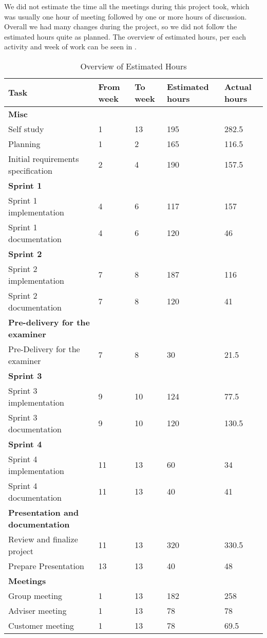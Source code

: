 \documentclass[../document]{subfiles}
\begin{document}
We did not estimate the time all the meetings during this project took, which was usually one hour of meeting followed by one or more hours of discussion. Overall we had many changes during the project, so we did not follow the estimated hours quite as planned. The overview of estimated hours, per each activity and week of work can be seen in .


\begin{table}
\caption{Overview of Estimated Hours}
\centering
\label{tab:time_estimate}
\begin{tabularx}{\textwidth}{|l|X|X|L{1.6cm}|L{1cm}|}
	\hline
	\textbf{Task}
	&\textbf{From week}
	&\textbf{To week}
	&\textbf{Estimated hours}
	&\textbf{Actual hours}
	\\ \hline \textbf{Misc}
	&
	&
	&
	&
	\\ \hline Self study
	&1
	&13
	&195
	&282.5
	\\ \hline Planning
	&1
	&2
	&165
	&116.5
	\\ \hline Initial requirements specification
	&2
	&4
	&190
	&157.5
	\\ \hline \textbf{Sprint 1}
	&
	&
	&
	&
	\\ \hline Sprint 1 implementation
	&4
	&6
	&117
	&157
	\\ \hline Sprint 1 documentation
	&4
	&6
	&120
	&46
	\\ \hline \textbf{Sprint 2}
	&
	&
	&
	&
	\\ \hline Sprint 2 implementation
	&7
	&8
	&187
	&116
	\\ \hline Sprint 2 documentation
	&7
	&8
	&120
	&41
	\\ \hline \textbf{Pre-delivery for the examiner}
	&
	&
	&
	&
	\\ \hline Pre-Delivery for the examiner
	&7
	&8
	&30
	&21.5
	\\ \hline \textbf{Sprint 3}
	&
	&
	&
	&
	\\ \hline Sprint 3 implementation
	&9
	&10
	&124
	&77.5
	\\ \hline Sprint 3 documentation
	&9
	&10
	&120
	&130.5
	\\ \hline \textbf{Sprint 4}
	&
	&
	&
	&
	\\ \hline Sprint 4 implementation
	&11
	&13
	&60
	&34
	\\ \hline Sprint 4 documentation
	&11
	&13
	&40
	&41
	\\ \hline \textbf{Presentation and documentation}
	&
	&
	&
	&
	\\ \hline Review and finalize project
	&11
	&13
	&320
	&330.5
	\\ \hline Prepare Presentation
	&13
	&13
	&40
	&48
	\\ \hline \textbf{Meetings}
	&
	&
	&
	&
	\\ \hline Group meeting
	&1
	&13
	&182
	&258
	\\ \hline Adviser meeting
	&1
	&13
	&78
	&78
	\\ \hline Customer meeting
	&1
	&13
	&78
	&69.5
	\\ \hline 
\end{tabularx}
\end{table}
\end{document}
